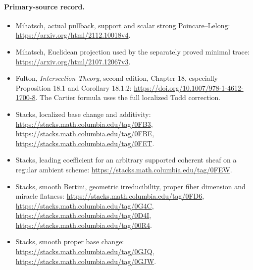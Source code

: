 \paragraph{Primary-source record.}
\begin{itemize}
\item Mihatsch, actual pullback, support and scalar strong
Poincare--Lelong:
\url{https://arxiv.org/html/2112.10018v4}.
\item Mihatsch, Euclidean projection used by the separately proved
minimal trace:
\url{https://arxiv.org/html/2107.12067v3}.
\item Fulton, \emph{Intersection Theory}, second edition, Chapter 18,
especially Proposition 18.1 and Corollary 18.1.2:
\url{https://doi.org/10.1007/978-1-4612-1700-8}.
The Cartier formula uses the full localized Todd correction.
\item Stacks, localized base change and additivity:
\url{https://stacks.math.columbia.edu/tag/0FB3},
\url{https://stacks.math.columbia.edu/tag/0FBE},
\url{https://stacks.math.columbia.edu/tag/0FET}.
\item Stacks, leading coefficient for an arbitrary supported coherent
sheaf on a regular ambient scheme:
\url{https://stacks.math.columbia.edu/tag/0FEW}.
\item Stacks, smooth Bertini, geometric irreducibility, proper fiber
dimension and miracle flatness:
\url{https://stacks.math.columbia.edu/tag/0FD6},
\url{https://stacks.math.columbia.edu/tag/0G4C},
\url{https://stacks.math.columbia.edu/tag/0D4I},
\url{https://stacks.math.columbia.edu/tag/00R4}.
\item Stacks, smooth proper base change:
\url{https://stacks.math.columbia.edu/tag/0GJQ},
\url{https://stacks.math.columbia.edu/tag/0GJW}.
\end{itemize}

